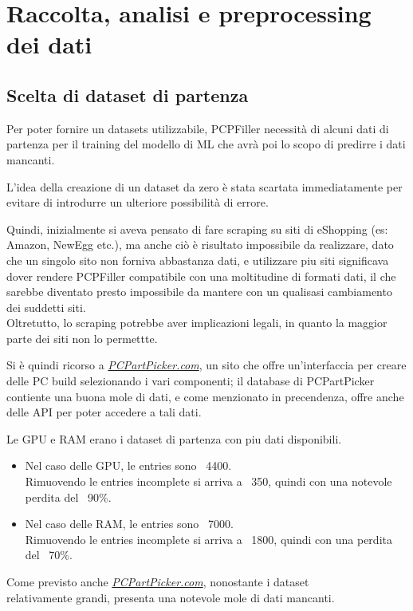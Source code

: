 \documentclass[12pt]{report}
\begin{document}
\newpage
\section{Raccolta, analisi e preprocessing dei dati}

\subsection{Scelta di dataset di partenza}
Per poter fornire un datasets utilizzabile, PCPFiller necessità di alcuni dati di partenza per il
training del modello di ML che avrà poi lo scopo di predirre i dati mancanti.

L'idea della creazione di un dataset da zero è stata scartata immediatamente per evitare di introdurre
un ulteriore possibilità di errore.

Quindi, inizialmente si aveva pensato di fare scraping su siti di eShopping (es: Amazon, NewEgg etc.),
ma anche ciò è risultato impossibile da realizzare, dato che un singolo sito non forniva abbastanza dati,
e utilizzare piu siti significava dover rendere PCPFiller compatibile con una moltitudine di formati
dati, il che sarebbe diventato presto impossibile da mantere con un qualisasi cambiamento dei suddetti siti.\\
Oltretutto, lo scraping potrebbe aver implicazioni legali, in quanto la maggior parte dei siti non lo permettte.

Si è quindi ricorso a \underline{\textit{PCPartPicker.com}}, un sito che offre un'interfaccia per
creare delle PC build selezionando i vari componenti; il database di PCPartPicker contiente una buona
mole di dati, e come menzionato in precendenza, offre anche delle API per poter accedere a tali dati.

Le GPU e RAM erano i dataset di partenza con piu dati disponibili.
\begin{itemize}
	\item Nel caso delle GPU, le entries sono ~4400.\\
		Rimuovendo le entries incomplete si arriva a ~350, quindi con una notevole perdita del ~90\%.
	\item Nel caso delle RAM, le entries sono ~7000.\\
		Rimuovendo le entries incomplete si arriva a ~1800, quindi con una perdita del ~70\%.
\end{itemize}
Come previsto anche \underline{\textit{PCPartPicker.com}}, nonostante i dataset \\relativamente grandi,
presenta una notevole mole di dati mancanti.
\end{document}
